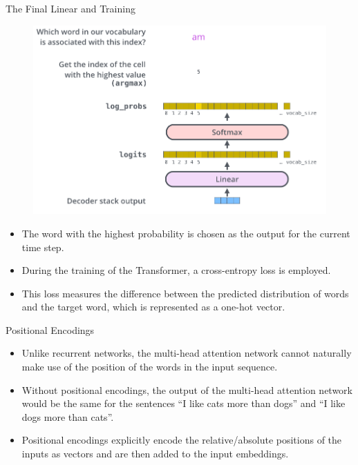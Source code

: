 \documentclass[handout]{beamer}
\begin{document}
\begin{frame}{The Final Linear and Training}

  \begin{figure}[h]
        	\includegraphics[scale = 0.2]{pics/transformer_decoder_output_softmax.png}
        \end{figure}  


\begin{scriptsize}
\begin{itemize}
 \item The word with the highest probability is chosen as the output for the current time step. 
\item During the training of the Transformer, a cross-entropy loss is employed. 
\item This loss measures the difference between the predicted distribution of words and the target word, which is represented as a one-hot vector.
 
 
\end{itemize}

\end{scriptsize}

\end{frame}


\begin{frame}{Positional Encodings}
\begin{scriptsize}
\begin{itemize}

 \item  Unlike recurrent networks, the multi-head attention network cannot naturally make use of the position of the words in the input sequence.
 
 \item Without positional encodings, the output of the multi-head attention network would be the same for the sentences ``I like cats more than dogs'' and ``I like dogs more than cats''.
 
 \item Positional encodings explicitly encode the relative/absolute positions of the inputs as vectors and are then added to the input embeddings.

\end{itemize}

\end{scriptsize}


\end{frame}
\end{document}
